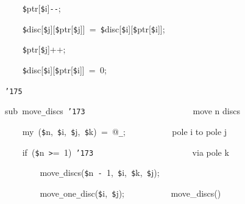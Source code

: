 \documentclass[a4paper,10pt]{article}
\def\mc{\relax}
\begin{document}
\noindent
\mbox{}{\tt\mc \ }{\tt\mc \ }{\tt\mc \ }{\tt\mc \ }{\tt\$}ptr[{\tt\$}i]{\tt -}{\tt -};

\noindent
\mbox{}{\tt\mc \ }{\tt\mc \ }{\tt\mc \ }{\tt\mc \ }{\tt\$}disc[{\tt\$}j][{\tt\$}ptr[{\tt\$}j]]{\tt\mc \ }={\tt\mc \ }{\tt\$}disc[{\tt\$}i][{\tt\$}ptr[{\tt\$}i]];

\noindent
\mbox{}{\tt\mc \ }{\tt\mc \ }{\tt\mc \ }{\tt\mc \ }{\tt\$}ptr[{\tt\$}j]++;

\noindent
\mbox{}{\tt\mc \ }{\tt\mc \ }{\tt\mc \ }{\tt\mc \ }{\tt\$}disc[{\tt\$}i][{\tt\$}ptr[{\tt\$}i]]{\tt\mc \ }={\tt\mc \ }0;

\noindent
\mbox{}{\tt\char'175}

\noindent
\mbox{}\hfill

\noindent
\mbox{}sub{\tt\mc \ }move{\tt\_}discs{\tt\mc \ }{\tt\char'173}{\tt\mc \ }{\tt\mc \ }{\tt\mc \ }{\tt\mc \ }{\tt\mc \ }{\tt\mc \ }{\tt\mc \ }{\tt\mc \ }{\tt\mc \ }{\tt\mc \ }{\tt\mc \ }{\tt\mc \ }{\tt\mc \ }{\tt\mc \ }{\tt\mc \ }{\tt\mc \ }{\tt\mc \ }{\tt\mc \ }{\tt\mc \ }{\tt\mc \ }{\tt\mc \ }{\tt\mc \ }{\tt\mc \ }{\tt\mc \ }\rm\mc {\tt\#} move n discs
\tt\mc 

\noindent
\mbox{}{\tt\mc \ }{\tt\mc \ }{\tt\mc \ }{\tt\mc \ }my{\tt\mc \ }({\tt\$}n,{\tt\mc \ }{\tt\$}i,{\tt\mc \ }{\tt\$}j,{\tt\mc \ }{\tt\$}k){\tt\mc \ }={\tt\mc \ }@{\tt\_};{\tt\mc \ }{\tt\mc \ }{\tt\mc \ }{\tt\mc \ }{\tt\mc \ }{\tt\mc \ }{\tt\mc \ }{\tt\mc \ }{\tt\mc \ }{\tt\mc \ }\rm\mc {\tt\#} pole i to pole j
\tt\mc 

\noindent
\mbox{}{\tt\mc \ }{\tt\mc \ }{\tt\mc \ }{\tt\mc \ }if{\tt\mc \ }({\tt\$}n{\tt\mc \ }{\tt >}={\tt\mc \ }1){\tt\mc \ }{\tt\char'173}{\tt\mc \ }{\tt\mc \ }{\tt\mc \ }{\tt\mc \ }{\tt\mc \ }{\tt\mc \ }{\tt\mc \ }{\tt\mc \ }{\tt\mc \ }{\tt\mc \ }{\tt\mc \ }{\tt\mc \ }{\tt\mc \ }{\tt\mc \ }{\tt\mc \ }{\tt\mc \ }{\tt\mc \ }{\tt\mc \ }{\tt\mc \ }{\tt\mc \ }{\tt\mc \ }{\tt\mc \ }\rm\mc {\tt\#} via pole k
\tt\mc 

\noindent
\mbox{}{\tt\mc \ }{\tt\mc \ }{\tt\mc \ }{\tt\mc \ }{\tt\mc \ }{\tt\mc \ }{\tt\mc \ }{\tt\mc \ }move{\tt\_}discs({\tt\$}n{\tt\mc \ }{\tt -}{\tt\mc \ }1,{\tt\mc \ }{\tt\$}i,{\tt\mc \ }{\tt\$}k,{\tt\mc \ }{\tt\$}j);

\noindent
\mbox{}{\tt\mc \ }{\tt\mc \ }{\tt\mc \ }{\tt\mc \ }{\tt\mc \ }{\tt\mc \ }{\tt\mc \ }{\tt\mc \ }move{\tt\_}one{\tt\_}disc({\tt\$}i,{\tt\mc \ }{\tt\$}j);{\tt\mc \ }{\tt\mc \ }{\tt\mc \ }{\tt\mc \ }{\tt\mc \ }{\tt\mc \ }{\tt\mc \ }{\tt\mc \ }{\tt\mc \ }{\tt\mc \ }\rm\mc {\tt\#} move\_discs()
\tt\mc 
\end{document}
